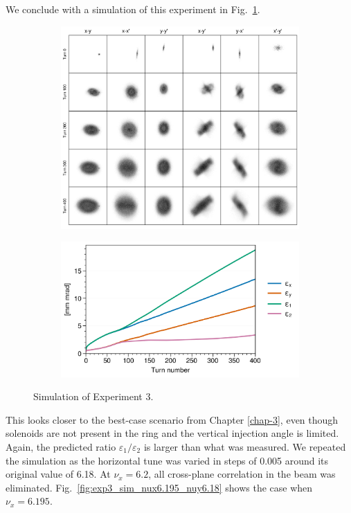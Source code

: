 We conclude with a simulation of this experiment in Fig.~\ref{fig:exp3_sim}.
%
\begin{figure}[!p]
    \centering
    \begin{subfigure}{\textwidth}
        \includegraphics[width=\textwidth]{Images/chapter5/exp3/sim_snapshots.png}
    \end{subfigure}
    \vfill
    \vspace*{1.0cm}
    \vfill
    \begin{subfigure}{0.7\textwidth}
        \includegraphics[width=\textwidth]{Images/chapter5/exp3/sim_emittances.png}
    \end{subfigure}
    \caption{Simulation of Experiment 3.}
    \label{fig:exp3_sim}
\end{figure}
%
This looks closer to the best-case scenario from Chapter \ref{chap-3}, even though solenoids are not present in the ring and the vertical injection angle is limited. Again, the predicted ratio $\varepsilon_1 / \varepsilon_2$ is larger than what was measured. We repeated the simulation as the horizontal tune was varied in steps of 0.005 around its original value of 6.18. At $\nu_x = 6.2$, all cross-plane correlation in the beam was eliminated. Fig.~\ref{fig:exp3_sim_nux6.195_nuy6.18} shows the case when $\nu_x = 6.195$. 
